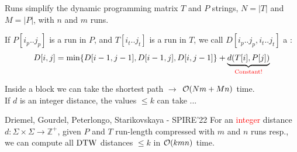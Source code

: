 \begin{frame}{Runs simplify the dynamic programming matrix}
    \small
    $T$ and $P$ strings, $N=|T|$ and $M=|P|$, with $n$ and $m$ runs. \pause
    \smallskip

    \pause
    
    \begin{overlayarea}{\textwidth}{2.5cm} 
    \centering
    \end{overlayarea}\pause
    
    If $P[i_p.. j_p]$ is a run in $P$, and $T[i_t .. j_t]$ is a run in $T$,  we call $D[i_p .. j_p, i_t .. j_t]$ a :\pause
    {
    \[
        D[i,j] = {\min\{D[i-1,j-1],D[i-1,j],D[i,j-1]\}
        + \underbrace{d(T[i], P[j])}_\text{\textcolor{red}{Constant!}}}
    \]
    }

    \pause       
   Inside a block we can take the shortest path \pause \pause $\rightarrow$ $\mathcal{O}(Nm+Mn)$ time.\\ \pause
    If $d$ is an integer distance, the values $\leq k$ can take ... \pause 
    
    \begin{myalertblock}{Driemel, Gourdel, Peterlongo, Starikovskaya - SPIRE'22}
        For an \textcolor{red}{integer} distance $d: \Sigma \times \Sigma \rightarrow \mathbb{Z}^+$, given $P$ and $T$ run-length compressed with $m$ and $n$ runs resp.,
        we can compute all $\mathrm{DTW}$ distances $\leq k$ in $\mathcal{O}(k mn)$ time.
    \end{myalertblock}
    \end{frame}

